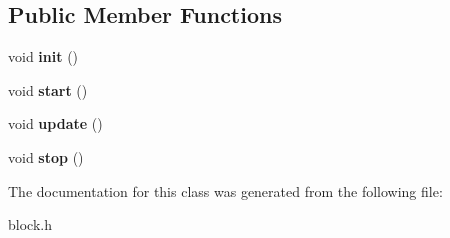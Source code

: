 \subsection*{Public Member Functions}
\begin{DoxyCompactItemize}
\item 
\mbox{\label{classBlockController_a5fab6bbac43e43d35debc69fba15e08a}} 
void {\bfseries init} ()
\item 
\mbox{\label{classBlockController_ad75ee01c90b8892462199ea68b0541c3}} 
void {\bfseries start} ()
\item 
\mbox{\label{classBlockController_a244582d5298910da92b770b1a4811c82}} 
void {\bfseries update} ()
\item 
\mbox{\label{classBlockController_a7ce9687c907f0d1bb99cccbef26cc26a}} 
void {\bfseries stop} ()
\end{DoxyCompactItemize}


The documentation for this class was generated from the following file\+:\begin{DoxyCompactItemize}
\item 
block.\+h\end{DoxyCompactItemize}
